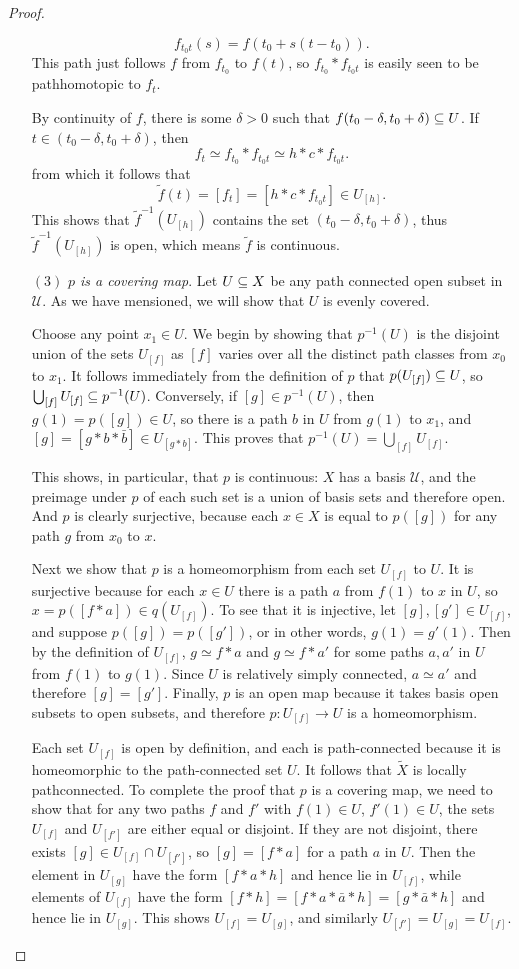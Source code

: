 \begin{proof}
\begin{itemize}
\[f_{t_0t}(s)=f(t_0+s(t-t_0)).\]
This path just follows $f$ from $f_{t_0}$ to $f(t)$, so $f_{t_0}\ast f_{t_0t}$ is easily seen to be pathhomotopic to $f_t$.\par
By continuity of $f$, there is some $\delta>0$ such that $f(t_0-\delta,t_0+\delta)\subseteq U$. If $t\in(t_0-\delta,t_0+\delta)$, then
\[f_t\simeq f_{t_0}\ast f_{t_0t}\simeq h\ast c\ast f_{t_0t}.\]
from which it follows that
\[\widetilde{f}(t)=[f_t]=[h\ast c\ast f_{t_0t}]\in U_{[h]}.\]
This shows that $\widetilde{f}^{-1}(U_{[h]})$ contains the set $(t_0-\delta,t_0+\delta)$, thus $\widetilde{f}^{-1}(U_{[h]})$ is open, which means $\widetilde{f}$ is continuous.
\item[$(3)$] \textit{$p$ is a covering map}. Let $U\subseteq X$ be any path connected open subset in $\mathcal{U}$. As we have mensioned, we will show that $U$ is evenly covered.\par
Choose any point $x_1\in U$. We begin by showing that $p^{-1}(U)$ is the disjoint union of the sets $U_{[f]}$ as $[f]$ varies over all the distinct path classes from $x_0$ to $x_1$. It follows immediately from the definition of $p$ that $p(U_{[f]})\subseteq U$, so $\bigcup_{[f]}U_{[f]}\subseteq p^{-1}(U)$. Conversely, if $[g]\in p^{-1}(U)$, then $g(1)=p([g])\in U$, so there is a path $b$ in $U$ from $g(1)$ to $x_1$, and $[g]=[g\ast b\ast\bar{b}]\in U_{[g\ast b]}$. This proves that $p^{-1}(U)=\bigcup_{[f]}U_{[f]}$.\par
This shows, in particular, that $p$ is continuous: $X$ has a basis $\mathcal{U}$, and the preimage under $p$ of each such set is a union of basis sets and therefore open. And $p$ is clearly surjective, because each $x\in X$ is equal to $p([g])$ for any path $g$ from $x_0$ to $x$.\par
Next we show that $p$ is a homeomorphism from each set $U_{[f]}$ to $U$. It is surjective because for each $x\in U$ there is a path $a$ from $f(1)$ to $x$ in $U$, so $x=p([f\ast a])\in q(U_{[f]})$. To see that it is injective, let $[g],[g']\in U_{[f]}$, and suppose $p([g])=p([g'])$, or in other words, $g(1)=g'(1)$. Then by the definition of $U_{[f]}$, $g\simeq f\ast a$ and $g\simeq f\ast a'$ for some paths $a,a'$ in $U$ from $f(1)$ to $g(1)$. Since $U$ is relatively simply connected, $a\simeq a'$ and therefore $[g]=[g']$. Finally, $p$ is an open map because it takes basis open subsets to open subsets, and therefore $p:U_{[f]}\to U$ is a homeomorphism.\par
Each set $U_{[f]}$ is open by definition, and each is path-connected because it
is homeomorphic to the path-connected set $U$. It follows that $\widetilde{X}$ is locally pathconnected. To complete the proof that $p$ is a covering map, we need to show that for any two paths $f$ and $f'$ with $f(1)\in U$, $f'(1)\in U$, the sets $U_{[f]}$ and $U_{[f']}$ are either equal or disjoint. If they are not disjoint, there exists $[g]\in U_{[f]}\cap U_{[f']}$, so $[g]=[f\ast a]$ for a path $a$ in $U$. Then the element in $U_{[g]}$ have the form $[f\ast a\ast h]$ and hence lie in $U_{[f]}$, while elements of $U_{[f]}$ have the form $[f\ast h] = [f\ast a\ast \bar{a}\ast h]=[g\ast\bar{a}\ast h]$ and hence lie in $U_{[g]}$. This shows $U_{[f]}=U_{[g]}$, and similarly $U_{[f']}=U_{[g]}=U_{[f]}$.

\end{itemize}
\end{proof}
